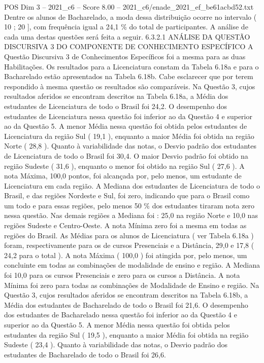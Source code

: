\begin{textsample}{POS Dim 3 – 2021\_c6 – Score 8.00 – 2021\_c6/enade\_2021\_ef\_be61acbd52.txt}
Dentre os alunos de Bacharelado, a moda dessa distribuição ocorre no intervalo ( 10 ; 20 ], com frequência igual a 24,1 \% do total de participantes.
A análise de cada uma destas questões será feita a seguir. 6.3.2.1 ANÁLISE DA QUESTÃO DISCURSIVA 3 DO COMPONENTE DE CONHECIMENTO ESPECÍFICO A Questão Discursiva 3 de Conhecimentos Específicos foi a mesma para as duas Habilitações.
Os resultados para a Licenciatura constam da Tabela 6.18a e para o Bacharelado estão apresentados na Tabela 6.18b.
Cabe esclarecer que por terem respondido à mesma questão os resultados são comparáveis.
Na Questão 3, cujos resultados aferidos se encontram descritos na Tabela 6.18a, a Média dos estudantes de Licenciatura de todo o Brasil foi 24,2.
O desempenho dos estudantes de Licenciatura nessa questão foi inferior ao da Questão 4 e superior ao da Questão 5.
A menor Média nessa questão foi obtida pelos estudantes de Licenciatura da região Sul ( 19,1 ), enquanto a maior Média foi obtida na região Norte ( 28,8 ).
Quanto à variabilidade das notas, o Desvio padrão dos estudantes de Licenciatura de todo o Brasil foi 30,4.
O maior Desvio padrão foi obtido na região Sudeste ( 31,6 ), enquanto o menor foi obtido na região Sul ( 27,6 ).
A nota Máxima, 100,0 pontos, foi alcançada por, pelo menos, um estudante de Licenciatura em cada região.
A Mediana dos estudantes de Licenciatura de todo o Brasil, e das regiões Nordeste e Sul, foi zero, indicando que para o Brasil como um todo e para essas regiões, pelo menos 50 \% dos estudantes tiraram nota zero nessa questão.
Nas demais regiões a Mediana foi : 25,0 na região Norte e 10,0 nas regiões Sudeste e Centro-Oeste.
A nota Mínima zero foi a mesma em todas as regiões do Brasil.
As Médias para os alunos de Licenciatura ( ver Tabela 6.18a ) foram, respectivamente para os de cursos Presenciais e a Distância, 29,0 e 17,8 ( 24,2 para o total ).
A nota Máxima ( 100,0 ) foi atingida por, pelo menos, um concluinte em todas as combinações de modalidade de ensino e região.
A Mediana foi 10,0 para os cursos Presenciais e zero para os cursos a Distância.
A nota Mínima foi zero para todas as combinações de Modalidade de Ensino e região.
Na Questão 3, cujos resultados aferidos se encontram descritos na Tabela 6.18b, a Média dos estudantes de Bacharelado de todo o Brasil foi 21,6.
O desempenho dos estudantes de Bacharelado nessa questão foi inferior ao da Questão 4 e superior ao da Questão 5.
A menor Média nessa questão foi obtida pelos estudantes da região Sul ( 19,5 ), enquanto a maior Média foi obtida na região Sudeste ( 23,4 ).
Quanto à variabilidade das notas, o Desvio padrão dos estudantes de Bacharelado de todo o Brasil foi 26,6.

\end{textsample}
